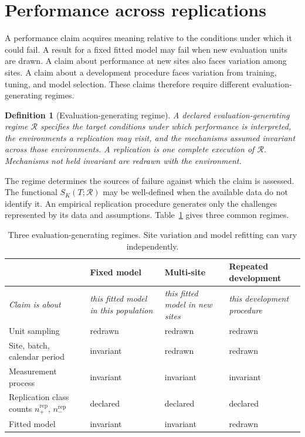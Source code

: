 \documentclass[11pt]{article}
\newcommand{\Regime}{\mathcal{R}}
\newtheorem{definition}{Definition}
\theoremstyle{remark}
\begin{document}
\section{Performance across replications}
\label{sec:regime}

A performance claim acquires meaning relative to the conditions under which it could fail. A result for a fixed fitted model may fail when new evaluation units are drawn. A claim about performance at new sites also faces variation among sites. A claim about a development procedure faces variation from training, tuning, and model selection. These claims therefore require different evaluation-generating regimes.

\begin{definition}[Evaluation-generating regime]
A declared evaluation-generating regime $\Regime$ specifies the target conditions under which performance is interpreted, the environments a replication may visit, and the mechanisms assumed invariant across those environments. A replication is one complete execution of $\Regime$. Mechanisms not held invariant are redrawn with the environment.
\end{definition}

The regime determines the sources of failure against which the claim is assessed. The functional $S_K(T;\Regime)$ may be well-defined when the available data do not identify it. An empirical replication procedure generates only the challenges represented by its data and assumptions. Table~\ref{tab:regimes} gives three common regimes.

\begin{table}[ht]
\centering
\caption{Three evaluation-generating regimes. Site variation and model refitting can vary independently.}
\label{tab:regimes}
\begin{tabularx}{\textwidth}{@{}l>{\centering\arraybackslash}X>{\centering\arraybackslash}X>{\centering\arraybackslash}X@{}}
\toprule
& Fixed model & Multi-site & Repeated development \\
\midrule
\emph{Claim is about} & \emph{this fitted model in this population} & \emph{this fitted model in new sites} & \emph{this development procedure} \\
\midrule
Unit sampling & redrawn & redrawn & redrawn \\
Site, batch, calendar period & invariant & redrawn & redrawn \\
Measurement process & invariant & invariant & invariant \\
Replication class counts $n_+^{\mathrm{rep}}$, $n_-^{\mathrm{rep}}$ & declared & declared & declared \\
Fitted model & invariant & invariant & redrawn \\
\bottomrule
\end{tabularx}
\end{table}
\end{document}
